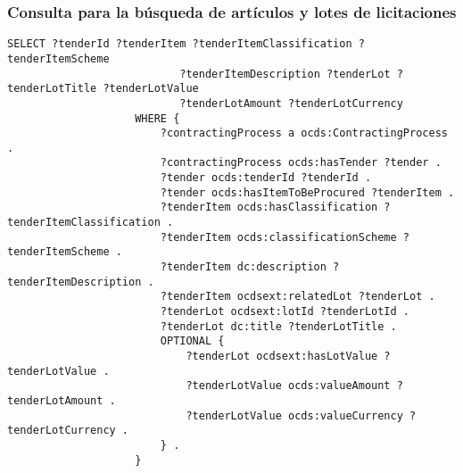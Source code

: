         \subsubsection{Consulta para la búsqueda de artículos y lotes de licitaciones}
            \begin{minipage}{\linewidth}
                \begin{lstlisting}[language=lSPARQL]
                    SELECT ?tenderId ?tenderItem ?tenderItemClassification ?tenderItemScheme 
                           ?tenderItemDescription ?tenderLot ?tenderLotTitle ?tenderLotValue 
                           ?tenderLotAmount ?tenderLotCurrency
                    WHERE {
                        ?contractingProcess a ocds:ContractingProcess .
                        ?contractingProcess ocds:hasTender ?tender .
                        ?tender ocds:tenderId ?tenderId .
                        ?tender ocds:hasItemToBeProcured ?tenderItem .
                        ?tenderItem ocds:hasClassification ?tenderItemClassification .
                        ?tenderItem ocds:classificationScheme ?tenderItemScheme .
                        ?tenderItem dc:description ?tenderItemDescription .
                        ?tenderItem ocdsext:relatedLot ?tenderLot .
                        ?tenderLot ocdsext:lotId ?tenderLotId .
                        ?tenderLot dc:title ?tenderLotTitle .
                        OPTIONAL {
                            ?tenderLot ocdsext:hasLotValue ?tenderLotValue .
                            ?tenderLotValue ocds:valueAmount ?tenderLotAmount .
                            ?tenderLotValue ocds:valueCurrency ?tenderLotCurrency .
                        } .
                    }
                \end{lstlisting}
            \end{minipage}
            
